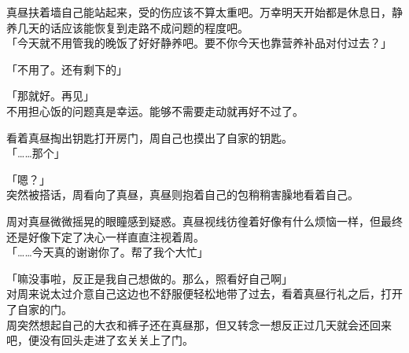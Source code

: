 真昼扶着墙自己能站起来，受的伤应该不算太重吧。万幸明天开始都是休息日，静养几天的话应该能恢复到走路不成问题的程度吧。\\

「今天就不用管我的晚饭了好好静养吧。要不你今天也靠营养补品对付过去？」

「不用了。还有剩下的」

「那就好。再见」\\

不用担心饭的问题真是幸运。能够不需要走动就再好不过了。

看着真昼掏出钥匙打开房门，周自己也摸出了自家的钥匙。\\

「……那个」

「嗯？」\\

突然被搭话，周看向了真昼，真昼则抱着自己的包稍稍害臊地看着自己。

周对真昼微微摇晃的眼瞳感到疑惑。真昼视线彷徨着好像有什么烦恼一样，但最终还是好像下定了决心一样直直注视着周。\\

「……今天真的谢谢你了。帮了我个大忙」

「嘛没事啦，反正是我自己想做的。那么，照看好自己啊」\\

对周来说太过介意自己这边也不舒服便轻松地带了过去，看着真昼行礼之后，打开了自家的门。\\

周突然想起自己的大衣和裤子还在真昼那，但又转念一想反正过几天就会还回来吧，便没有回头走进了玄关关上了门。
